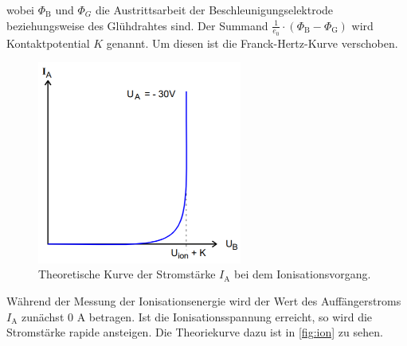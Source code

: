 wobei $\Phi_\text{B}$ und $\Phi_G$ die Austrittsarbeit der Beschleunigungselektrode beziehungsweise des Glühdrahtes sind.
Der Summand $\frac{1}{e_0} \cdot (\Phi_\text{B} - \Phi_\text{G})$ wird Kontaktpotential $K$ genannt. Um diesen ist die Franck-Hertz-Kurve verschoben.

\begin{figure}
    \centering
    \includegraphics[width=0.6\textwidth]{content/ionisierung.PNG}
    \caption{Theoretische Kurve der Stromstärke $I_\text{A}$ bei dem Ionisationsvorgang\cite{V601}.}
    \label{fig:ion}
\end{figure}

Während der Messung der Ionisationsenergie wird der Wert des Auffängerstroms $I_\text{A}$ zunächst 0 A betragen.
Ist die Ionisationsspannung erreicht, so wird die Stromstärke rapide ansteigen. Die Theoriekurve dazu ist in \autoref{fig:ion} zu sehen.
